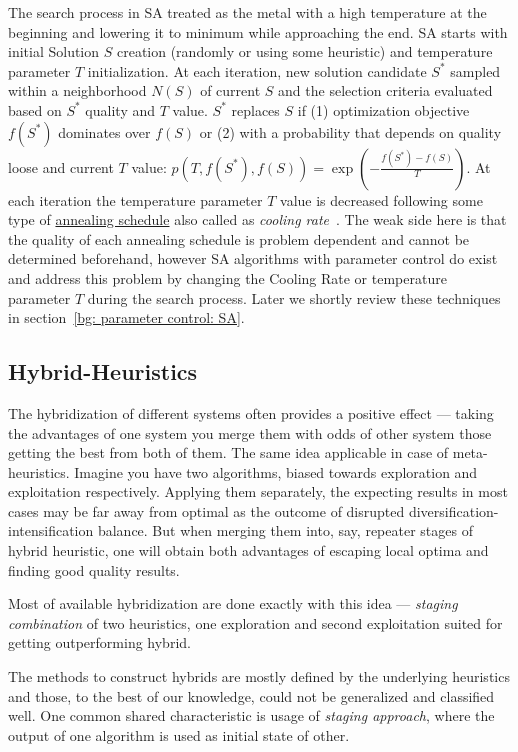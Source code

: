 The search process in SA treated as the metal with a high temperature at the beginning and lowering it to minimum while approaching the end. %
SA starts with initial Solution $S$ creation (randomly or using some heuristic) and temperature parameter \underline{$T$} initialization. At each iteration, new solution candidate $S^*$ sampled within a neighborhood $N(S)$ of current $S$ and the selection criteria evaluated based on $S^*$ quality and $T$ value. $S^*$ replaces $S$ if (1) optimization objective $f(S^*)$ dominates over $f(S)$ or (2) with a probability that depends on quality loose and current $T$ value: $p(T, f(S^*), f(S)) = \exp(-\frac{f(S^*) - f(S)}{T})$. %
At each iteration the temperature parameter $T$ value is decreased following some type of \underline{annealing schedule} also called as \textit{cooling rate}~\cite{boussaid2013survey}. The weak side here is that the quality of each annealing schedule is problem dependent and cannot be determined beforehand, however SA algorithms with parameter control do exist and address this problem by changing the Cooling Rate or temperature parameter $T$ during the search process. Later we shortly review these techniques in section~\ref{bg: parameter control: SA}.


\subsection{Hybrid-Heuristics}
The hybridization of different systems often provides a positive effect — taking the advantages of one system you merge them with odds of other system those getting the best from both of them. The same idea applicable in case of meta-heuristics. Imagine you have two algorithms, biased towards exploration and exploitation respectively. Applying them separately, the expecting results in most cases may be far away from optimal as the outcome of disrupted diversification-intensification balance. But when merging them into, say, repeater stages of hybrid heuristic, one will obtain both advantages of escaping local optima and finding good quality results. 

Most of available hybridization are done exactly with this idea — \textit{staging combination} of two heuristics, one exploration and second exploitation suited for getting outperforming hybrid.

The methods to construct hybrids are mostly defined by the underlying heuristics and those, to the best of our knowledge, could not be generalized and classified well. One common shared characteristic is usage of \textit{staging approach}, where the output of one algorithm is used as initial state of other. 


